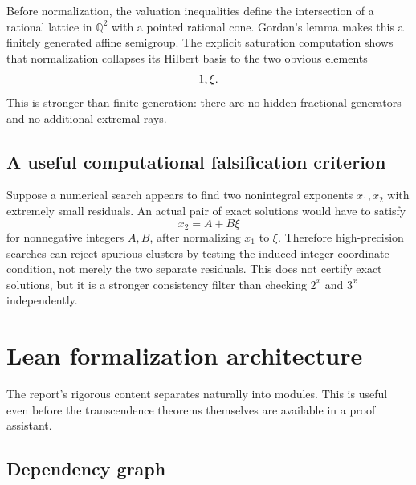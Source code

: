 \documentclass[11pt,oneside]{article}
\theoremstyle{definition}
\newcommand{\Q}{\mathbb Q}
\begin{document}
Before normalization, the valuation inequalities define the intersection of a rational lattice in $\Q^2$ with a pointed rational cone.  Gordan's lemma makes this a finitely generated affine semigroup.  The explicit saturation computation shows that normalization collapses its Hilbert basis to the two obvious elements
\[
  1,\\ \xi.
\]
This is stronger than finite generation: there are no hidden fractional generators and no additional extremal rays.

\subsection{A useful computational falsification criterion}

Suppose a numerical search appears to find two nonintegral exponents $x_1,x_2$ with extremely small residuals.  An actual pair of exact solutions would have to satisfy
\[
  x_2=A+B\xi
\]
for nonnegative integers $A,B$, after normalizing $x_1$ to $\xi$.  Therefore high-precision searches can reject spurious clusters by testing the induced integer-coordinate condition, not merely the two separate residuals.  This does not certify exact solutions, but it is a stronger consistency filter than checking $2^x$ and $3^x$ independently.

\section{Lean formalization architecture}

The report's rigorous content separates naturally into modules.  This is useful even before the transcendence theorems themselves are available in a proof assistant.

\subsection{Dependency graph}
\end{document}

